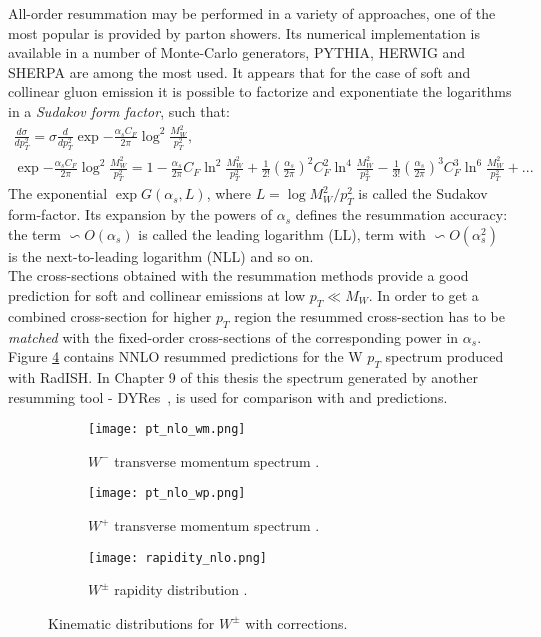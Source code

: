 	 All-order resummation may be performed in a variety of approaches, one of the most popular is provided by parton showers. Its numerical implementation is available in a number of Monte-Carlo generators, PYTHIA, HERWIG and SHERPA are among the most used. It appears that for the case of soft and collinear gluon emission it is possible to factorize and exponentiate the logarithms in a \textit{Sudakov form factor}, such that:
	 	\begin{equation}
	 		\begin{array}{lcl} 
		\frac{d\sigma}{dp_T^2}=\sigma\frac{d}{dp_T^2}\exp{-\frac{\alpha_s C_F}{2\pi}\log^2{\frac{M_W^2}{p_T^2}}},\\
		\exp{-\frac{\alpha_s C_F}{2\pi}\log^2{\frac{M_W^2}{p_T^2}}}=1-\frac{\alpha_s}{2\pi}C_F\ln^2{\frac{M_W^2}{p_T^2}}+\frac{1}{2!}\left(\frac{\alpha_s}{2\pi}\right)^2C^2_F\ln^4{\frac{M_W^2}{p_T^2}}-\frac{1}{3!}\left(\frac{\alpha_s}{2\pi}\right)^3C^3_F\ln^6{\frac{M_W^2}{p_T^2}}+...
				 \end{array}
	 \end{equation}	
	 The exponential $\exp{G(\alpha_s,L)}$, where $L=\log{M^2_W/p^2_T}$ is called the Sudakov form-factor. Its expansion by the powers of $\alpha_s$ defines the resummation accuracy: the term $\backsim O(\alpha_s)$ is called the leading logarithm (LL), term with $ \backsim O(\alpha_s^2)$ is the next-to-leading logarithm (NLL) and so on. \\
	 The cross-sections obtained with the resummation methods provide a good prediction for soft and collinear emissions at low $p_T\ll M_W$. In order to get a combined cross-section for higher $p_T$ region the resummed cross-section has to be \textit{matched} with the fixed-order cross-sections of the corresponding power in $\alpha_s$. Figure \ref{fig::w_kinematics} contains NNLO resummed predictions for the W $p_T$ spectrum produced with RadISH\cite{Radish}. In Chapter 9 of this thesis the spectrum generated by another resumming tool - DYRes~\cite{dyres}, is used for comparison with \Powheg and \Sherpa predictions.
	 \begin{figure}[htbp]
	 	\begin{subfigure}[t]{0.31\textwidth} 
	 		\texttt{[image: pt\_nlo\_wm.png]}
	 		\caption[Transverse view]{$W^{-}$ transverse momentum spectrum \cite{Bizon:2019zgf}.}
	 		\label{fig::wm_pt}
	 	\end{subfigure}
	 	\begin{subfigure}[t]{0.31\textwidth}
	 		\texttt{[image: pt\_nlo\_wp.png]}
	 		\caption[Side view]{$W^{+}$ transverse momentum spectrum \cite{Bizon:2019zgf}.}
	 		\label{fig::wp_pt}
	 	\end{subfigure}
	 	\hfill
	 		\begin{subfigure}[t]{0.36\textwidth}
	 		\texttt{[image: rapidity\_nlo.png]}
	 		\caption[Side view]{$W^{\pm}$ rapidity distribution \cite{Anastasiou:2003ds}.}
	 		\label{fig::w_rapid}
	 	\end{subfigure}
	 	\caption{Kinematic distributions for $W^{\pm}$ with corrections.}
	 	\label{fig::w_kinematics}
	 \end{figure}
